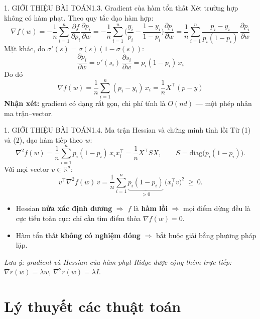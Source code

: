 \documentclass[aspectratio=169,11pt]{beamer}
\newcommand{\nx}{\textbf{Nhận xét:}}
\newcommand{\R}{\mathbb{R}}
\begin{document}
\begin{frame}{1. GIỚI THIỆU BÀI TOÁN}{1.3. Gradient của hàm tổn thất}
  \small
  Xét trường hợp không có hàm phạt. Theo quy tắc đạo hàm hợp:
  \[
    \nabla f(w)=-\frac1n\sum_{i=1}^n\frac{\partial f}{\partial p_i}\frac{\partial p_i}{\partial w}
    =-\frac1n\sum_{i=1}^n\Big(\frac{y_i}{p_i}-\frac{1-y_i}{1-p_i}\Big)\frac{\partial p_i}{\partial w}
    =\frac1n\sum_{i=1}^n\frac{p_i-y_i}{p_i(1-p_i)}\,\frac{\partial p_i}{\partial w}
  \]
  Mặt khác, do $\sigma'(s)=\sigma(s)(1-\sigma(s))$:
  \[
    \frac{\partial p_i}{\partial w}=\sigma'(s_i)\,\frac{\partial s_i}{\partial w}=p_i(1-p_i)\,x_i
    \tag{1}
  \]
  Do đó
  \[
    \boxed{\ \nabla f(w)=\frac1n\sum_{i=1}^n (p_i-y_i)\,x_i=\frac1n X^\top(p-y)\ }
    \tag{2}
  \]
  \nx{} gradient có dạng rất gọn, chi phí tính là $O(nd)$ — một phép nhân ma trận--vector.
\end{frame}

\begin{frame}{1. GIỚI THIỆU BÀI TOÁN}{1.4. Ma trận Hessian và chứng minh tính lồi}
  \small
  Từ (1) và (2), đạo hàm tiếp theo $w$:
  \[
    \nabla^2 f(w)=\frac1n\sum_{i=1}^n p_i(1-p_i)\,x_i x_i^\top=\frac1n X^\top S X,
    \qquad S=\mathrm{diag}\big(p_i(1-p_i)\big).
  \]
  Với mọi vector $v\in\R^d$:
  \[
    v^\top \nabla^2f(w)\, v=\frac1n\sum_{i=1}^n \underbrace{p_i(1-p_i)}_{>0}\,\big(x_i^\top v\big)^2\ \ge\ 0 .
  \]
  \begin{itemize}
    \item Hessian \textbf{nửa xác định dương} $\Rightarrow$ $f$ là \textbf{hàm lồi} $\Rightarrow$
          mọi điểm dừng đều là cực tiểu toàn cục: chỉ cần tìm điểm thỏa $\nabla f(w)=0$.
    \item Hàm tổn thất \textbf{không có nghiệm đóng} $\Rightarrow$ bắt buộc giải bằng phương pháp lặp.
  \end{itemize}
  \vspace{2pt}
  \textit{Lưu ý: gradient và Hessian của hàm phạt Ridge được cộng thêm trực tiếp:}
  $\nabla r(w)=\lambda w$, $\nabla^2 r(w)=\lambda I$.
\end{frame}

\section{Lý thuyết các thuật toán}
\end{document}
